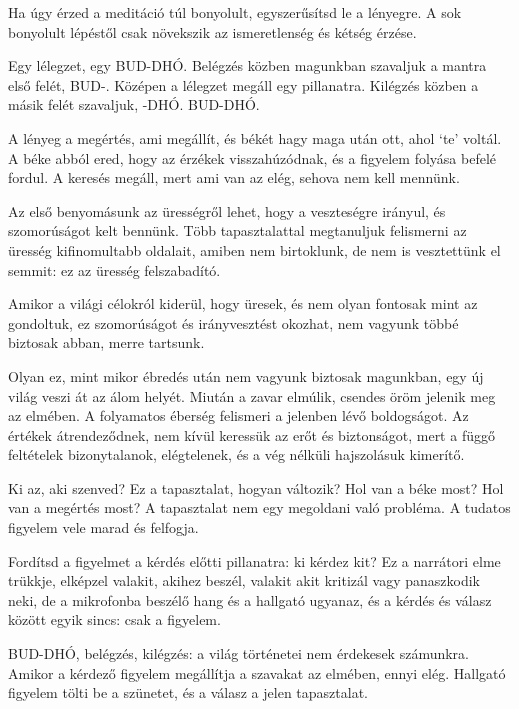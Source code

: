 Ha úgy érzed a meditáció túl bonyolult, egyszerűsítsd le a lényegre. A
sok bonyolult lépéstől csak növekszik az ismeretlenség és kétség érzése.

Egy lélegzet, egy BUD-DHÓ. Belégzés közben magunkban szavaljuk a mantra
első felét, BUD-. Középen a lélegzet megáll egy pillanatra. Kilégzés
közben a másik felét szavaljuk, -DHÓ. BUD-DHÓ.

A lényeg a megértés, ami megállít, és békét hagy maga után ott, ahol
`te' voltál. A béke abból ered, hogy az érzékek visszahúzódnak, és a
figyelem folyása befelé fordul. A keresés megáll, mert ami van az elég,
sehova nem kell mennünk.


Az első benyomásunk az ürességről lehet, hogy a veszteségre irányul, és
szomorúságot kelt bennünk. Több tapasztalattal megtanuljuk felismerni az
üresség kifinomultabb oldalait, amiben nem birtoklunk, de nem is
vesztettünk el semmit: ez az üresség felszabadító.

Amikor a világi célokról kiderül, hogy üresek, és nem olyan fontosak
mint az gondoltuk, ez szomorúságot és irányvesztést okozhat, nem vagyunk
többé biztosak abban, merre tartsunk.

Olyan ez, mint mikor ébredés után nem vagyunk biztosak magunkban, egy új
világ veszi át az álom helyét. Miután a zavar elmúlik, csendes öröm
jelenik meg az elmében. A folyamatos éberség felismeri a jelenben lévő
boldogságot. Az értékek átrendeződnek, nem kívül keressük az erőt és
biztonságot, mert a függő feltételek bizonytalanok, elégtelenek, és a
vég nélküli hajszolásuk kimerítő.

Ki az, aki szenved? Ez a tapasztalat, hogyan változik? Hol van a béke
most? Hol van a megértés most? A tapasztalat nem egy megoldani való
probléma. A tudatos figyelem vele marad és felfogja.

\enlargethispage*{\baselineskip}

Fordítsd a figyelmet a kérdés előtti pillanatra: ki kérdez kit? Ez a
narrátori elme trükkje, elképzel valakit, akihez beszél, valakit akit
kritizál vagy panaszkodik neki, de a mikrofonba beszélő hang és a
hallgató ugyanaz, és a kérdés és válasz között egyik sincs: csak a
figyelem.

\clearpage


BUD-DHÓ, belégzés, kilégzés: a világ történetei nem érdekesek számunkra.
Amikor a kérdező figyelem megállítja a szavakat az elmében, ennyi elég.
Hallgató figyelem tölti be a szünetet, és a válasz a jelen tapasztalat.

